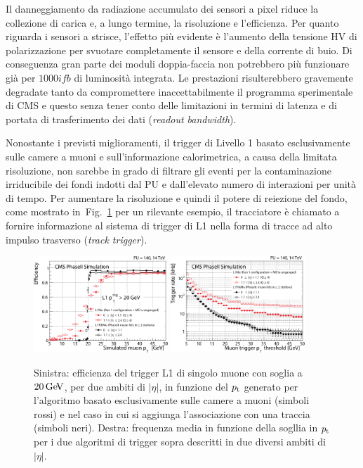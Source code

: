 Il danneggiamento da radiazione accumulato dei sensori a pixel riduce la collezione di carica e, a lungo termine, la risoluzione e l'efficienza. 
Per quanto riguarda i sensori a strisce, l'effetto pi\`u evidente \`e l'aumento della tensione HV di polarizzazione per svuotare completamente il sensore e della corrente di buio. Di conseguenza gran parte dei moduli doppia-faccia non potrebbero pi\`u funzionare gi\`a per $1000ifb$ di luminosit\`a integrata. Le prestazioni risulterebbero gravemente degradate tanto da compromettere inaccettabilmente il programma sperimentale di CMS e questo senza tener conto delle limitazioni in termini di latenza e di portata di trasferimento dei dati ({\em readout bandwidth}).

Nonostante i previsti miglioramenti, il trigger di Livello 1 basato esclusivamente sulle camere a muoni e sull'informazione calorimetrica, a causa della limitata risoluzione, non sarebbe in grado di filtrare gli eventi per la contaminazione irriducibile dei fondi indotti dal PU e dall'elevato numero di interazioni per unit\`a di tempo. Per aumentare la risoluzione e quindi il potere di reiezione del fondo, come mostrato in~Fig.~\ref{fig:CMSTkL1} per un rilevante esempio, il tracciatore \`e chiamato a fornire informazione al sistema di trigger di L1 nella forma di tracce ad alto impulso trasverso ({\em track trigger}).
\begin{figure}
\centering
\includegraphics[width=0.45\textwidth]{Immagini/CMSTkL1_res.PNG}
\hfill
\includegraphics[width=0.45\textwidth]{Immagini/CMSTkL1_rate.PNG}
\caption{Sinistra: efficienza del trigger L1 di singolo muone con soglia a $20{\rm \, Ge\kern-0.125em V}$, per due ambiti di $|\eta|$, in funzione del ${p_{\rm t}}$ generato per l'algoritmo basato esclusivamente sulle camere a muoni (simboli rossi) e nel caso in cui si aggiunga l'associazione con una traccia (simboli neri). Destra: frequenza media in funzione della sogllia in ${p_{\rm t}}$ per i due algoritmi di trigger sopra descritti in due diversi ambiti di $|\eta|$.}
\label{fig:CMSTkL1}
\end{figure}

